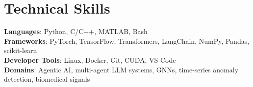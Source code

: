 \documentclass[letterpaper,11pt]{article}
\begin{document}
\section{Technical Skills}
 \begin{itemize}[leftmargin=0.15in, label={}]
    \small{\item{
     \textbf{Languages}{: Python, C/C++, MATLAB, Bash} \\
     \textbf{Frameworks}{: PyTorch, TensorFlow, Transformers, LangChain, NumPy, Pandas, scikit-learn} \\
     \textbf{Developer Tools}{: Linux, Docker, Git, CUDA, VS Code} \\
     \textbf{Domains}{: Agentic AI, multi-agent LLM systems, GNNs, time-series anomaly detection, biomedical signals}
    }}
 \end{itemize}


\end{document}
